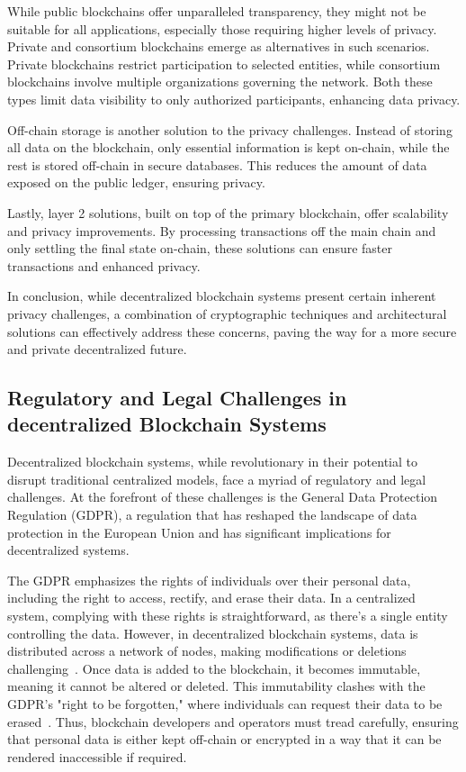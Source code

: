 While public blockchains offer unparalleled transparency, they might not be suitable for all applications, especially those requiring higher levels of privacy. Private and consortium blockchains emerge as alternatives in such scenarios. Private blockchains restrict participation to selected entities, while consortium blockchains involve multiple organizations governing the network. Both these types limit data visibility to only authorized participants, enhancing data privacy.

Off-chain storage is another solution to the privacy challenges. Instead of storing all data on the blockchain, only essential information is kept on-chain, while the rest is stored off-chain in secure databases. This reduces the amount of data exposed on the public ledger, ensuring privacy.

Lastly, layer 2 solutions, built on top of the primary blockchain, offer scalability and privacy improvements. By processing transactions off the main chain and only settling the final state on-chain, these solutions can ensure faster transactions and enhanced privacy.

In conclusion, while decentralized blockchain systems present certain inherent privacy challenges, a combination of cryptographic techniques and architectural solutions can effectively address these concerns, paving the way for a more secure and private decentralized future.

\subsection{Regulatory and Legal Challenges in decentralized Blockchain Systems}
Decentralized blockchain systems, while revolutionary in their potential to disrupt traditional centralized models, face a myriad of regulatory and legal challenges. At the forefront of these challenges is the General Data Protection Regulation (GDPR), a regulation that has reshaped the landscape of data protection in the European Union and has significant implications for decentralized systems.

The GDPR emphasizes the rights of individuals over their personal data, including the right to access, rectify, and erase their data. In a centralized system, complying with these rights is straightforward, as there's a single entity controlling the data. However, in decentralized blockchain systems, data is distributed across a network of nodes, making modifications or deletions challenging~\cite{Schwerin.2018}. Once data is added to the blockchain, it becomes immutable, meaning it cannot be altered or deleted. This immutability clashes with the GDPR's "right to be forgotten," where individuals can request their data to be erased~\cite{BelenSaglam.}. Thus, blockchain developers and operators must tread carefully, ensuring that personal data is either kept off-chain or encrypted in a way that it can be rendered inaccessible if required.

